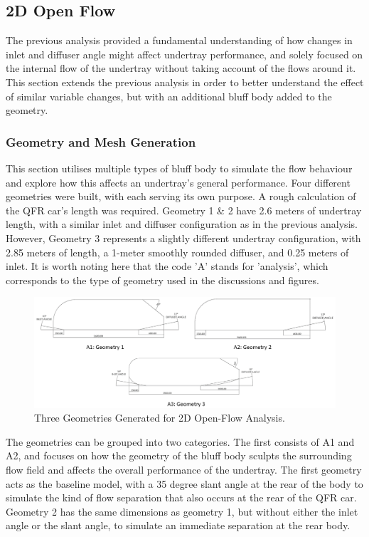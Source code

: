 

\subsection{2D Open Flow}
The previous analysis provided a fundamental understanding of how changes in inlet and diffuser angle might affect undertray performance, and solely focused on the internal flow of the undertray without taking account of the flows around it. This section extends the previous analysis in order to better understand the effect of similar variable changes, but with an additional bluff body added to the geometry. 

\subsubsection{Geometry and Mesh Generation}
This section utilises multiple types of bluff body to simulate the flow behaviour and explore how this affects an undertray's general performance. Four different geometries were built, with each serving its own purpose. A rough calculation of the QFR car's length was required. Geometry 1 \& 2 have 2.6 meters of undertray length, with a similar inlet and diffuser configuration as in the previous analysis. However, Geometry 3 represents a slightly different undertray configuration, with 2.85 meters of length, a 1-meter smoothly rounded diffuser, and 0.25 meters of inlet. It is worth noting here that the code 'A' stands for 'analysis', which corresponds to the type of geometry used in the discussions and figures.

\begin{figure}[!ht]
    \centering
    \includegraphics[scale = 0.45]{Figures/2D_OF/2D_OF_GEOM.png}
    \caption{Three Geometries Generated for 2D Open-Flow Analysis.}
    \label{fig:2D_OF_GEOM}
\end{figure}

\noindent The geometries can be grouped into two categories. The first consists of A1 and A2, and focuses on how the geometry of the bluff body sculpts the surrounding flow field and affects the overall performance of the undertray. The first geometry acts as the baseline model, with a 35 degree slant angle at the rear of the body to simulate the kind of flow separation that also occurs at the rear of the QFR car. Geometry 2 has the same dimensions as geometry 1, but without either the inlet angle or the slant angle, to simulate an immediate separation at the rear body.

